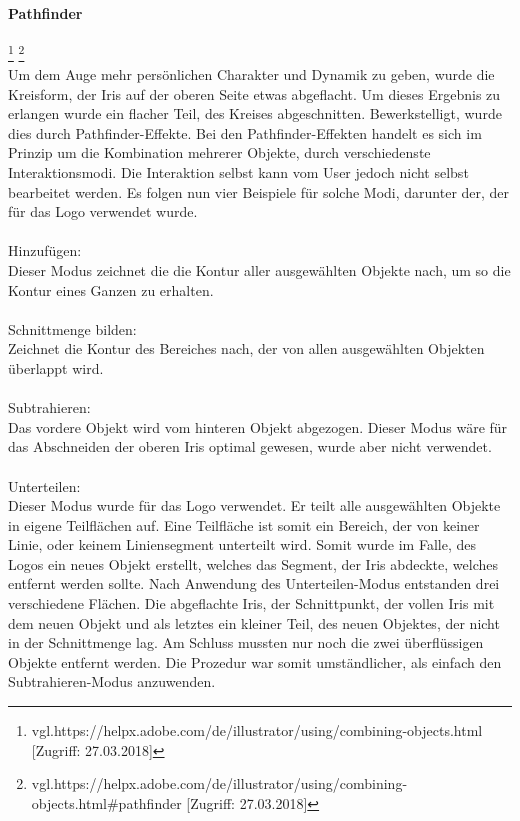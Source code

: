 \paragraph{Pathfinder}
\footnote{\label{} vgl.https://helpx.adobe.com/de/illustrator/using/combining-objects.html [Zugriff: 27.03.2018]}
\footnote{\label{} vgl.https://helpx.adobe.com/de/illustrator/using/combining-objects.html\#pathfinder  [Zugriff: 27.03.2018]}
\leavevmode \\
Um dem Auge mehr persönlichen Charakter und Dynamik zu geben, wurde die Kreisform, der Iris auf der oberen Seite etwas abgeflacht. Um dieses Ergebnis zu erlangen wurde ein flacher Teil, des Kreises abgeschnitten. Bewerkstelligt, wurde dies durch Pathfinder-Effekte. Bei den Pathfinder-Effekten handelt es sich im Prinzip um die Kombination mehrerer Objekte, durch verschiedenste Interaktionsmodi. Die Interaktion selbst kann vom User jedoch nicht selbst bearbeitet werden. Es folgen nun vier Beispiele für solche Modi, darunter der, der für das Logo verwendet wurde.
\leavevmode \\
\leavevmode \\
Hinzufügen:
\leavevmode \\
Dieser Modus zeichnet die die Kontur aller ausgewählten Objekte nach, um so die Kontur eines Ganzen zu erhalten.
\leavevmode \\
\leavevmode \\
Schnittmenge bilden:
\leavevmode \\
Zeichnet die Kontur des Bereiches nach, der von allen ausgewählten Objekten überlappt wird.
\leavevmode \\
\leavevmode \\
Subtrahieren:
\leavevmode \\
Das vordere Objekt wird vom hinteren Objekt abgezogen. Dieser Modus wäre für das Abschneiden der oberen Iris optimal gewesen, wurde aber nicht verwendet.
\leavevmode \\
\leavevmode \\
Unterteilen:
\leavevmode \\
Dieser Modus wurde für das Logo verwendet. Er teilt alle ausgewählten Objekte in eigene Teilflächen auf. Eine Teilfläche ist somit ein Bereich, der von keiner Linie, oder keinem Liniensegment unterteilt wird. Somit wurde im Falle, des Logos ein neues Objekt erstellt, welches das Segment, der Iris abdeckte, welches entfernt werden sollte. Nach Anwendung des Unterteilen-Modus entstanden drei verschiedene Flächen. Die abgeflachte Iris, der Schnittpunkt, der vollen Iris mit dem neuen Objekt und als letztes ein kleiner Teil, des neuen Objektes, der nicht in der Schnittmenge lag. Am Schluss mussten nur noch die zwei überflüssigen Objekte entfernt werden. Die Prozedur war somit umständlicher, als einfach den Subtrahieren-Modus anzuwenden.
\leavevmode \\


